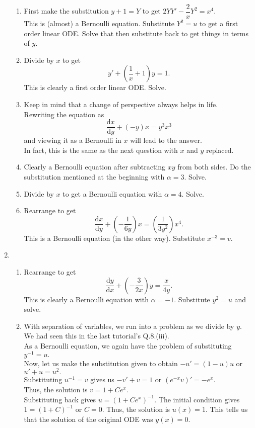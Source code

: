 \documentclass[12pt]{article}
\theoremstyle{definition}
\numberwithin{thm}{section}
\newcommand{\dd}{{\mathrm d}}
\begin{document}
\begin{enumerate}[leftmargin=*, label = Q.\arabic*.]
\begin{enumerate}[label = (\roman*)]
		\item First make the substitution $y + 1 = Y$ to get $2YY' - \dfrac{2}{x}Y^2 = x^4.$\\
		This is (almost) a Bernoulli equation. Substitute $Y^2 = u$ to get a first order linear ODE. Solve that then substitute back to get things in terms of $y.$
		\item Divide by $x$ to get
		\[y' + \left(\dfrac{1}{x} + 1\right)y = 1.\]
		This is clearly a first order linear ODE. Solve.
		\item Keep in mind that a change of perspective always helps in life.\\
		Rewriting the equation as
		\[\frac{\dd x}{\dd y} + (-y)x = y^3x^3\]
		and viewing it as a Bernoulli in $x$ will lead to the answer.\\
		In fact, this is the same as the next question with $x$ and $y$ replaced.
		\item Clearly a Bernoulli equation after subtracting $xy$ from both sides. Do the substitution mentioned at the beginning with $\alpha = 3.$ Solve.
		\item Divide by $x$ to get a Bernoulli equation with $\alpha = 4.$ Solve.
		\item Rearrange to get
		\[\frac{\dd x}{\dd y} + \left(-\frac{1}{6y}\right)x = \left(\frac{1}{3y^2}\right)x^4.\]
		This is a Bernoulli equation (in the other way). Substitute $x^{-3} = v.$
	\end{enumerate}
	\item 
	\begin{enumerate}[label = (\roman*)] 
		\item Rearrange to get
		\[\dfrac{\dd y}{\dd x} + \left(-\frac{3}{2x}\right)y = \frac{x}{4y}.\]
		This is clearly a Bernoulli equation with $\alpha = -1.$ Substitute $y^2 = u$ and solve.
		\item With separation of variables, we run into a problem as we divide by $y.$ We had seen this in the last tutorial's Q.8.(iii).\\
		As a Bernoulli equation, we again have the problem of substituting $y^{-1} = u.$\\
		Now, let us make the substitution given to obtain $-u' = (1 - u)u$ or $u' + u = u^2.$\\
		Substituting $u^{-1} = v$ gives us $-v' + v = 1$ or $(e^{-x}v)' = -e^x.$\\
		Thus, the solution is $v = 1 + Ce^x.$\\
		Substituting back gives $u = (1 + Ce^x)^{-1}.$ The initial condition gives $1 = (1 + C)^{-1}$ or $C = 0.$ Thus, the solution is $u(x) = 1.$ This tells us that the solution of the original ODE was $y(x) = 0.$\\

\end{enumerate}
\end{enumerate}
\end{document}
